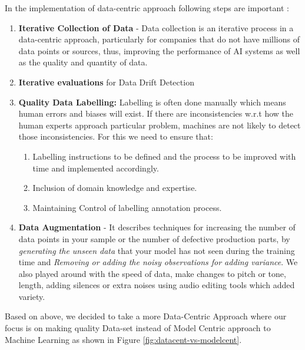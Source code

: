 In the implementation of data-centric approach following steps are important \cite{radecic_data-centric_2022}:
\begin{enumerate}
    \item \textbf{Iterative Collection of Data} - Data collection is an iterative process in a data-centric approach, particularly for companies that do not have millions of data points or sources, thus, improving the performance of AI systems as well as the quality and quantity of data.
    \item \textbf{Iterative evaluations} for Data Drift Detection  
    \item \textbf{Quality Data Labelling:} Labelling is often done manually which means human errors and biases will exist. If there are inconsistencies w.r.t how the human experts approach particular problem, machines are not likely to detect those inconsistencies. For this we need to ensure that: 
    \begin{enumerate}[label=(\alph*)]
        \item Labelling instructions to be defined and the process to be improved with time and implemented accordingly. 
        \item Inclusion of domain knowledge and expertise.
        \item Maintaining Control of labelling annotation process.
    \end{enumerate}
    \item \textbf{Data Augmentation} - It describes techniques for increasing the number of data points in your sample or the number of defective production parts, by \textit{generating the unseen data} that your model has not seen during the training time and \textit{Removing or adding the noisy observations for adding variance}. We also played around with the speed of data, make changes to pitch or tone, length, adding silences or extra noises using audio editing tools \cite{noauthor_linux_nodate} which added variety.        
\end{enumerate}

Based on above, we decided to take a more Data-Centric Approach where our focus is on making quality Data-set instead of Model Centric approach to Machine Learning as shown in Figure \ref{fig:datacent-vs-modelcent}.





